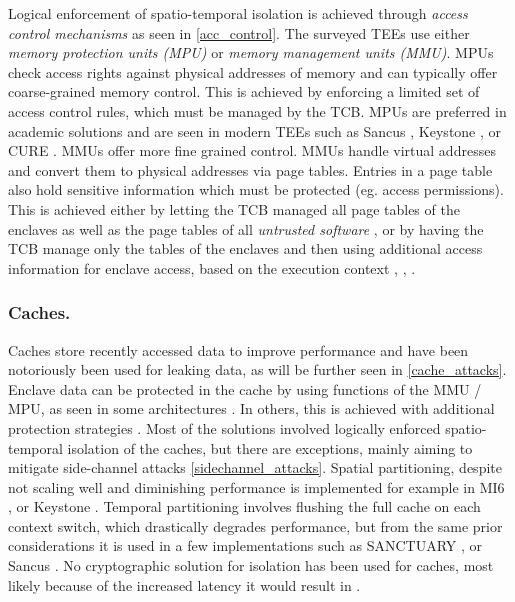 \documentclass[runningheads,a4paper]{uwsese}
\begin{document}
Logical enforcement of spatio-temporal isolation is achieved through
\emph{access control mechanisms} as seen in \ref{acc_control}. The surveyed
TEEs use either \emph{memory protection units (MPU)} or \emph{memory management
units (MMU)}. MPUs check access rights against physical addresses of memory and
can typically offer coarse-grained memory control. This is achieved by
enforcing a limited set of access control rules, which must be managed by the
TCB. MPUs are preferred in academic solutions and are seen in modern TEEs such
as Sancus \cite{tee_sancus}, Keystone \cite{tee_keystone}, or CURE
\cite{tee_cure}. MMUs offer more fine grained control. MMUs handle virtual
addresses and convert them to physical addresses via page tables. Entries in a
page table also hold sensitive information which must be protected (eg. access
permissions). This is achieved either by letting the TCB managed all page
tables of the enclaves as well as the page tables of all \emph{untrusted
software} \cite{tee_ha-vmsi}, or by having the TCB manage only the tables of
the enclaves and then using additional access information for enclave access,
based on the execution context \cite{intel_tdx}, \cite{arm_tz},
\cite{arm_realms} \cite{tee_hw_sup}.

\subsubsection{Caches.}

Caches store recently accessed data to improve performance and have been
notoriously been used for leaking data, as will be further seen in
\ref{cache_attacks}. Enclave data can be protected in the cache by using
functions of the MMU / MPU, as seen in some architectures \cite{intel_sgx}. In
others, this is achieved with additional protection strategies \cite{arm_tz}.
Most of the solutions involved logically enforced spatio-temporal isolation of
the caches, but there are exceptions, mainly aiming to mitigate side-channel
attacks \ref{sidechannel_attacks}. Spatial partitioning, despite not scaling
well and diminishing performance is implemented for example in MI6
\cite{tee_mi6}, or Keystone \cite{tee_keystone}. Temporal partitioning involves
flushing the full cache on each context switch, which drastically degrades
performance, but from the same prior considerations it is used in a few
implementations such as SANCTUARY \cite{tee_sanctuary}, or Sancus
\cite{tee_sancus}. No cryptographic solution for isolation has been used for
caches, most likely because of the increased latency it would result in
\cite{tee_hw_sup}.
\end{document}
